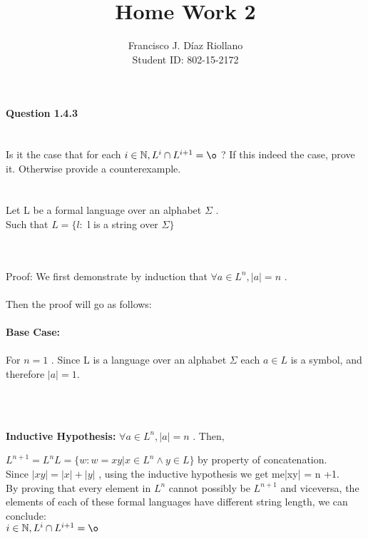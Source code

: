 \documentclass{report}
\title{Home Work 2}
\author{Francisco J. Díaz Riollano \\ Student ID: 802-15-2172 }
\newcommand{\me}[1]{
\begin{math}
#1
\end{math}
}
\begin{document}
\maketitle
\paragraph{\Large{Question 1.4.3\\ \\}}
 Is it the case that for each \me{i \in \mathbb{N},L^i \cap L^{i+1} = \o} ? If this indeed the case, prove it. Otherwise provide a counterexample.\\
 \\ \\
Let L be a formal language over an alphabet \me{\Sigma}.\\  Such that \me{L = \{l:} l is a string over \me{\Sigma \}}
\\ \\
Proof:
We first demonstrate by induction that \me{\forall a \in L^n,|a| = n}. \\ \\
Then the proof will go as follows:
\\ \\
\textbf{Base Case:} \\ \\
For \me{n=1}. Since L is a language over an alphabet \me{\Sigma} each \me{a \in L} is a symbol, and therefore \me{|a|=1.}
\\ \\
\begin{flushleft}
	\textbf{Inductive Hypothesis:} \me{\forall a \in L^n, |a|=n}. Then,
	\me{ L^{n+1} = L^nL= \{w:w =xy| x \in L^n \land y \in L\}} by property of concatenation.\\
	Since \me{|xy| = |x| + |y|}, using the inductive hypothesis we get me{|xy| = n +1}.\\
	By proving that every element in \me{L^n} cannot possibly be \me{L^{n+1}} and viceversa, the elements of each of these formal languages have different string length, we can conclude:
	\\ 
	\me{i \in \mathbb{N},L^i \cap L^{i+1} = \o} 




\end{flushleft}



 
\end{document}
